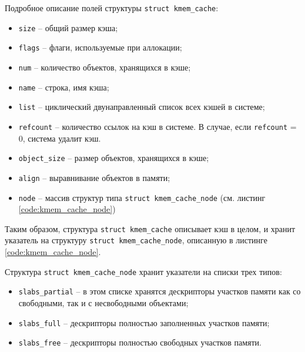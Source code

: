 
Подробное описание полей структуры \texttt{struct kmem\_cache}:

\begin{itemize}
	\item \texttt{size} -- общий размер кэша;
	\item \texttt{flags} -- флаги, используемые при аллокации;
	\item \texttt{num} -- количество объектов, хранящихся в кэше;
	\item \texttt{name} -- строка, имя кэша;
	\item \texttt{list} -- циклический двунаправленный список всех кэшей в системе;
	\item \texttt{refcount} -- количество ссылок на кэш в системе. В случае, если \texttt{refcount} = 0, система удалит кэш.
	\item \texttt{object\_size} -- размер объектов, хранящихся в кэше;
	\item \texttt{align} -- выравнивание объектов в памяти;
	\item \texttt{node} -- массив структур типа \texttt{struct kmem\_cache\_node} (см. листинг \ref{code:kmem_cache_node})
\end{itemize}

Таким образом, структура \texttt{struct kmem\_cache} описывает кэш в целом, и хранит указатель на структуру \texttt{struct kmem\_cache\_node}, описанную в листинге \ref{code:kmem_cache_node}.


Структура \texttt{struct kmem\_cache\_node} хранит указатели на списки трех типов:

\begin{itemize}
	\item \texttt{slabs\_partial} -- в этом списке хранятся дескрипторы участков памяти как со свободными, так и с несвободными объектами;
	\item \texttt{slabs\_full} -- дескрипторы полностью заполненных участков памяти;
	\item \texttt{slabs\_free} -- дескрипторы полностью свободных участков памяти.
\end{itemize}

